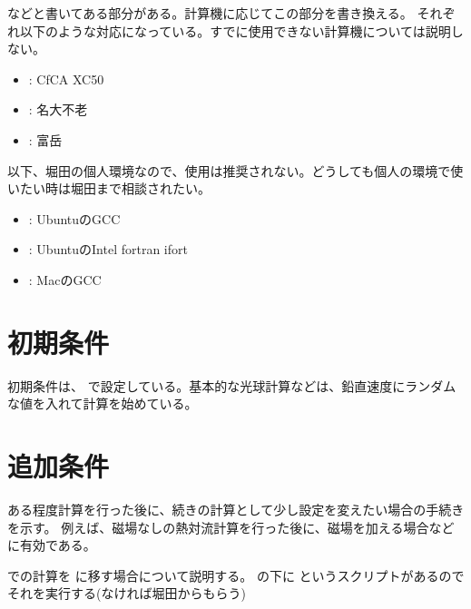 \documentclass[letterpaper,10pt,dvipdfmx,report]{sphinxmanual}
\begin{document}
\sphinxAtStartPar
などと書いてある部分がある。計算機に応じてこの部分を書き換える。
それぞれ以下のような対応になっている。すでに使用できない計算機については説明しない。
\begin{itemize}
\item {} 
\sphinxAtStartPar
{}: CfCA XC50

\item {} 
\sphinxAtStartPar
{}: 名大不老

\item {} 
\sphinxAtStartPar
{}: 富岳

\end{itemize}

\sphinxAtStartPar
以下、堀田の個人環境なので、使用は推奨されない。どうしても個人の環境で使いたい時は堀田まで相談されたい。
\begin{itemize}
\item {} 
\sphinxAtStartPar
{}: UbuntuのGCC

\item {} 
\sphinxAtStartPar
{}: UbuntuのIntel fortran ifort

\item {} 
\sphinxAtStartPar
{}: MacのGCC

\end{itemize}


\section{初期条件}
\label{\detokenize{start:id3}}
\sphinxAtStartPar
初期条件は、  で設定している。基本的な光球計算などは、鉛直速度にランダムな値を入れて計算を始めている。


\section{追加条件}
\label{\detokenize{start:id4}}
\sphinxAtStartPar
ある程度計算を行った後に、続きの計算として少し設定を変えたい場合の手続きを示す。
例えば、磁場なしの熱対流計算を行った後に、磁場を加える場合などに有効である。

\sphinxAtStartPar
{} での計算を  に移す場合について説明する。
 の下に  というスクリプトがあるのでそれを実行する(なければ堀田からもらう)
\end{document}
